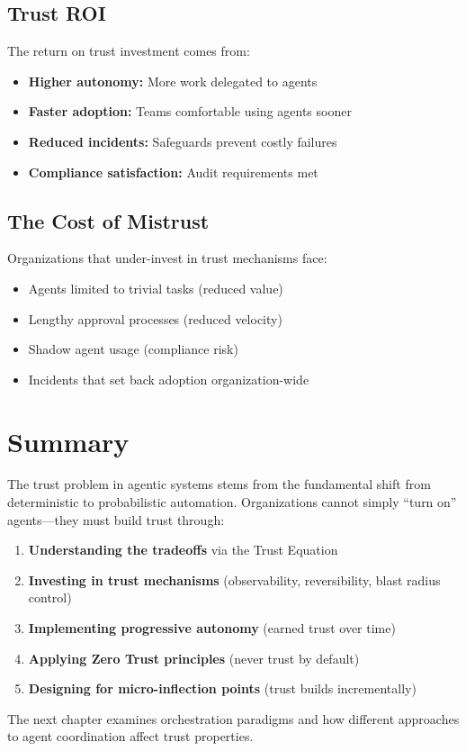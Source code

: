 \subsection{Trust ROI}
\label{subsec:trust-roi}

The return on trust investment comes from:
\begin{itemize}
    \item \textbf{Higher autonomy:} More work delegated to agents
    \item \textbf{Faster adoption:} Teams comfortable using agents sooner
    \item \textbf{Reduced incidents:} Safeguards prevent costly failures
    \item \textbf{Compliance satisfaction:} Audit requirements met
\end{itemize}

\subsection{The Cost of Mistrust}
\label{subsec:cost-mistrust}

Organizations that under-invest in trust mechanisms face:
\begin{itemize}
    \item Agents limited to trivial tasks (reduced value)
    \item Lengthy approval processes (reduced velocity)
    \item Shadow agent usage (compliance risk)
    \item Incidents that set back adoption organization-wide
\end{itemize}

\section{Summary}
\label{sec:governance-summary}

The trust problem in agentic systems stems from the fundamental shift from deterministic to probabilistic automation. Organizations cannot simply ``turn on'' agents---they must build trust through:

\begin{enumerate}
    \item \textbf{Understanding the tradeoffs} via the Trust Equation
    \item \textbf{Investing in trust mechanisms} (observability, reversibility, blast radius control)
    \item \textbf{Implementing progressive autonomy} (earned trust over time)
    \item \textbf{Applying Zero Trust principles} (never trust by default)
    \item \textbf{Designing for micro-inflection points} (trust builds incrementally)
\end{enumerate}

The next chapter examines orchestration paradigms and how different approaches to agent coordination affect trust properties.
